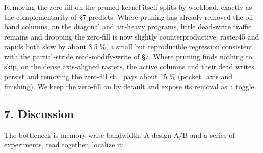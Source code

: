\documentclass[
]{article}
\begin{document}
Removing the zero-fill on the pruned kernel itself splits by workload,
exactly as the complementarity of §7 predicts. Where pruning has already
removed the off-band columns, on the diagonal and air-heavy programs,
little dead-write traffic remains and dropping the zero-fill is now
slightly counterproductive: raster45 and rapids both slow by about 3.5
\%, a small but reproducible regression consistent with the
partial-stride read-modify-write of §7. Where pruning finds nothing to
skip, on the dense axis-aligned rasters, the active columns and their
dead writes persist and removing the zero-fill still pays about 15 \%
(pocket\_axis and finishing). We keep the zero-fill on by default and
expose its removal as a toggle.

\hypertarget{discussion}{%
\subsection{7. Discussion}\label{discussion}}

The bottleneck is memory-write bandwidth. A design A/B and a series of
experiments, read together, localize it:
\end{document}
